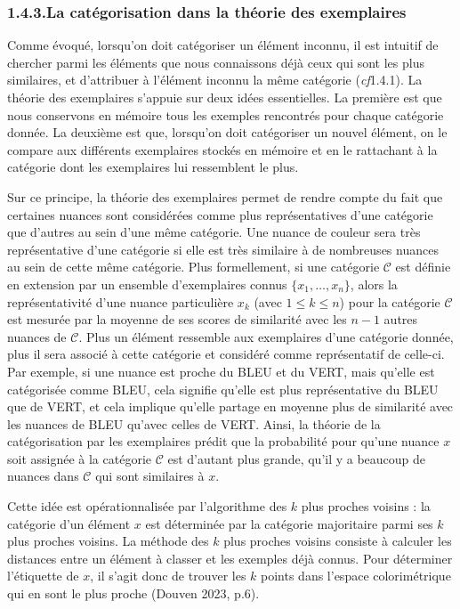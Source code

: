\documentclass{article}
\begin{document}
\subsubsection*{1.4.3.\quad La catégorisation dans la théorie des exemplaires}

Comme évoqué, lorsqu’on doit catégoriser un élément inconnu, il est intuitif de chercher parmi les éléments que nous connaissons déjà ceux qui sont les plus similaires, et d'attribuer à l'élément inconnu la même catégorie (\textit{cf}1.4.1). La théorie des exemplaires s’appuie sur deux idées essentielles. La première est que nous conservons en mémoire tous les exemples rencontrés pour chaque catégorie donnée. La deuxième est que, lorsqu’on doit catégoriser un nouvel élément, on le compare aux différents exemplaires stockés en mémoire et en le rattachant à la catégorie dont les exemplaires lui ressemblent le plus.
\par
Sur ce principe, la théorie des exemplaires permet de rendre compte du fait que certaines nuances sont considérées comme plus représentatives d'une catégorie que d'autres au sein d’une même catégorie. Une nuance de couleur sera très représentative d’une catégorie si elle est très similaire à de nombreuses nuances au sein de cette même catégorie. Plus formellement, si une catégorie $\mathcal{C}$ est définie en extension par un ensemble d'exemplaires connus $\{x_1, \ldots, x_n\}$, alors la représentativité d'une nuance particulière $x_k$ (avec $1 \leq k \leq n$) pour la catégorie $\mathcal{C}$ est mesurée par la moyenne de ses scores de similarité avec les $n-1$ autres nuances de $\mathcal{C}$. Plus un élément ressemble aux exemplaires d'une catégorie donnée, plus il sera associé à cette catégorie et considéré comme représentatif de celle-ci. Par exemple, si une nuance est proche du BLEU et du VERT, mais qu’elle est catégorisée comme BLEU, cela signifie qu’elle est plus représentative du BLEU que de VERT, et cela implique qu’elle partage en moyenne plus de similarité avec les nuances de BLEU qu’avec celles de VERT. Ainsi, la théorie de la catégorisation par les exemplaires prédit que la probabilité pour qu'une nuance $x$ soit assignée à la catégorie $\mathcal{C}$ est d’autant plus grande, qu’il y a beaucoup de nuances dans $\mathcal{C}$ qui sont similaires à $x$.
\par
Cette idée est opérationnalisée par l’algorithme des $k$ plus proches voisins : la catégorie d’un élément $x$ est déterminée par la catégorie majoritaire parmi ses $k$ plus proches voisins. La méthode des $k$ plus proches voisins consiste à calculer les distances entre un élément à classer et les exemples déjà connus. Pour déterminer l’étiquette de $x$, il s’agit donc de trouver les $k$ points dans l’espace colorimétrique qui en sont le plus proche (Douven 2023, p.6).
\end{document}
